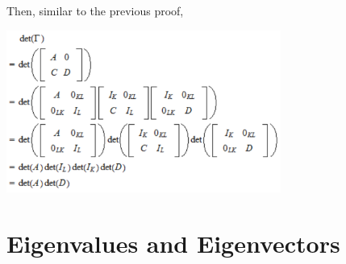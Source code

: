 \documentclass{report}
\begin{document}
Then, similar to the previous proof,
\begin{center}
\includegraphics[width=9cm]{130}
\end{center}
\newpage

\chapter{Eigenvalues and Eigenvectors}
\end{document}
